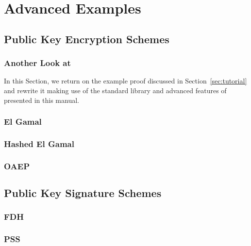 
\chapter{Advanced Examples}

\section{Public Key Encryption Schemes}
\subsection{Another Look at \citet{br93}}
In this Section, we return on the example proof discussed in
Section~\ref{sec:tutorial} and rewrite it making use of the standard library and
advanced features of \EC presented in this manual.

\subsection{El Gamal}

\subsection{Hashed El Gamal}

\subsection{OAEP}

\section{Public Key Signature Schemes}
\subsection{FDH}
\subsection{PSS}

